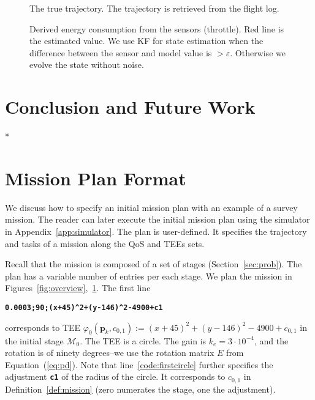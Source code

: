 \documentclass[letterpaper,10pt,conference]{ieeeconf}
\newcommand{\figpath}{./figures}
\theoremstyle{definition}
\begin{document}
\begin{figure}[h]
  \centering
  
  \caption{The true trajectory. The trajectory is retrieved from the flight log.}
  \label{fig:trajectory}
\end{figure}

\begin{figure}[h]
  \centering
  
  \caption{Derived energy consumption from the sensors (throttle). Red line is the estimated value. We use KF for state estimation when the difference between the sensor and model value is $>\varepsilon$. Otherwise we evolve the state without noise.}
  \label{fig:energy-max}
\end{figure}


\section{Conclusion and Future Work}
\label{sec:conclusion}

*

\leavevmode\thispagestyle{empty}\newpage %
\leavevmode\thispagestyle{empty}\newpage


 

\leavevmode\thispagestyle{empty}\newpage

\appendices
\section{Mission Plan Format}

We discuss how to specify an initial mission plan with an example of a survey mission. The reader can later execute the initial mission plan using the simulator in Appendix~\ref{app:simulator}. The plan is user-defined. It specifies the trajectory and tasks of a mission along the QoS and TEEs sets. 

Recall that the mission is composed of a set of stages (Section~\ref{sec:prob}). The plan has a variable number of entries per each stage. We plan the mission in Figures~\ref{fig:overview},~\ref{fig:trajectory}. The first line
\begin{algorithmic}[1]
  \State\textbf{\texttt{0.0003;90;(x+45)\^{}2+(y-146)\^{}2-4900+c1}}\label{code:firstcircle}
\end{algorithmic}
corresponds to TEE $\varphi_0(\mathbf{p}_k,c_{0,1}):=(x+45)^2+(y-146)^2-4900+c_{0,1}$ in the initial stage $\mathcal{M}_0$. The TEE is a circle. The gain is $k_e=3\cdot 10^{-4}$, and the rotation is of ninety degrees--we use the rotation matrix $E$ from Equation~(\ref{eq:pd}). Note that line~\ref{code:firstcircle} further specifies the adjustment {\tt\textbf{c1}} of the radius of the circle. It corresponds to $c_{0,1}$ in Definition~\ref{def:mission} (zero numerates the stage, one the adjustment).
\end{document}

